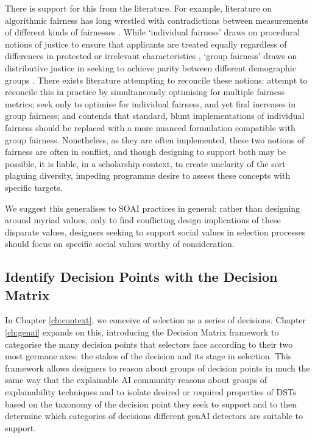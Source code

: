 There is support for this from the literature. For example, literature on algorithmic fairness has long wrestled with contradictions between measurements of different kinds of fairnesses \cite{pmlr-v80-kearns18a}. While `individual fairness' draws on procedural notions of justice to ensure that applicants are treated equally regardless of differences in protected or irrelevant characteristics \cite{dwork_fairness_2012}, `group fairness' draws on distributive justice in seeking to achieve parity between different demographic groups \cite{Citron_2008,Olsaretti_2018}. There exists literature attempting to reconcile these notions: \textcite{pmlr-v28-zemel13} attempt to reconcile this in practice by simultaneously optimising for multiple fairness metrics; \textcite{lahoti2019ifairlearningindividuallyfair} seek only to optimise for individual fairness, and yet find increases in group fairness; and \textcite{binns_apparent_2019} contends that standard, blunt implementations of individual fairness should be replaced with a more nuanced formulation compatible with group fairness. Nonetheless, as they are often implemented, these two notions of fairness are often in conflict, and though designing to support both may be possible, it is liable, in a scholarship context, to create unclarity of the sort plaguing diversity, impeding programme desire to assess these concepts with specific targets. 

We suggest this generalises to SOAI practices in general: rather than designing around myriad values, only to find conflicting design implications of these disparate values, designers seeking to support social values in selection processes should focus on specific social values worthy of consideration.

\subsection{Identify Decision Points with the Decision Matrix}
In Chapter \ref{ch:context}, we conceive of selection as a series of decisions. Chapter \ref{ch:genai} expands on this, introducing the Decision Matrix framework to categorise the many decision points that selectors face according to their two most germane axes: the stakes of the decision and its stage in selection. This framework allows designers to reason about groups of decision points in much the same way that the explainable AI community reasons about groups of explainability techniques and to isolate desired or required properties of DSTs based on the taxonomy of the decision point they seek to support and to then determine which categories of decisions different genAI detectors are suitable to support\cite{ford_play_2020,kumar_problems_2020,doshi-velez_towards_2017,friedrich_taxonomy_2011,molnar_interpretable_2019}. 

